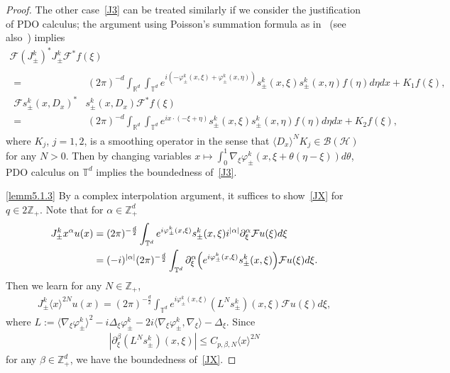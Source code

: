 \documentclass[10pt,a4paper]{amsart}
\renewcommand{\a}{\alpha}
\renewcommand{\b}{\beta}
\newcommand{\f}{\varphi}
\newcommand{\x}{\xi}
\newcommand{\R}{\mathbb{R}}
\newcommand{\Z}{\mathbb{Z}}
\newcommand{\T}{\mathbb{T}}
\newcommand{\HS}{\mathcal{H}}
\newcommand{\FS}{\mathcal{F}}
\newcommand{\BS}{\mathcal{B}}
\newcommand{\jap}[1]{\langle #1 \rangle}
\begin{document}
\begin{proof}
The other case~\eqref{J3} can be treated similarly if we consider the justification of PDO calculus; the argument using Poisson's summation formula as in~\cite[Lemma~7.1]{N3} (see also~\cite[Lemma~2.3]{T1}) implies
\begin{multline*}
\FS \left(J_\pm^k\right)^* J_\pm^k \FS^* f(\x) \\
\begin{aligned}
=&\,(2\pi)^{-d} \int_{\R^d} \int_{\T^d} e^{i\left(-\f_{\pm}^k(x,\x)+\f_{\pm}^k(x,\eta)\right)} s_\pm^k(x,\x) s_\pm^k(x,\eta) f(\eta) d\eta dx + K_1 f(\x), \\
\FS s_\pm^k(x,D_x)^* & s_\pm^k(x,D_x) \FS^* f(\x) \\
=&\,(2\pi)^{-d} \int_{\R^d} \int_{\T^d} e^{i x\cdot(-\x+\eta)} s_\pm^k(x,\x) s_\pm^k(x,\eta) f(\eta) d\eta dx + K_2 f(\x),
\end{aligned}
\end{multline*}
where $K_j$, $j=1,2$, is a smoothing operator in the sense that $\jap{D_x}^N K_j \in \BS(\HS)$ for any $N>0$. Then by changing variables $x\mapsto \int_0^1 \nabla_\x\f_\pm^k(x,\x+\theta(\eta-\x))d\theta$, PDO calculus on $\T^d$ implies the boundedness of~\eqref{J3}.

\eqref{lemm5.1.3} By a complex interpolation argument, it suffices to show~\eqref{JX} for $q\in 2\Z_+$. Note that for $\a\in\Z_+^d$
\begin{align*}
 J_\pm^k x^\a u(x) 
&= (2\pi)^{-\frac{d}{2}} \int_{\T^d} e^{i\f_{\pm}^k(x,\x)}s_\pm^k(x,\x) i^{|\a|}\partial_{\x}^\a \FS u(\x) d\x \\
&= (-i)^{|\a|} (2\pi)^{-\frac{d}{2}} \int_{\T^d} \partial_{\x}^\a \Bigl(e^{i\f_{\pm}^k(x,\x)} s_\pm^k(x,\x) \Bigr) \FS u(\x) d\x. 
\end{align*}
Then we learn for any $N\in\Z_+$,
\begin{align*}
J_\pm^k \jap{x}^{2N} u(x) = (2\pi)^{-\frac{d}{2}} \int_{\T^d} e^{i\f_{\pm}^k(x,\x)} \left(L^{N}s_\pm^k\right)(x,\x) \FS u(\x) d\x,
\end{align*}
where $L := \jap{\nabla_\x\f_\pm^k}^2 - i\Delta_\x\f_\pm^k - 2i\jap{\nabla_\x\f_\pm^k,\nabla_\x} - \Delta_\x$. Since
\begin{align*}
\left|\partial_\x^\b\left(L^{N}s_\pm^k\right)(x,\x)\right| \leq C_{p,\b,N} \jap{x}^{2N}
\end{align*}
for any $\b\in\Z_+^d$, we have the boundedness of~\eqref{JX}.




\end{proof}
\end{document}
